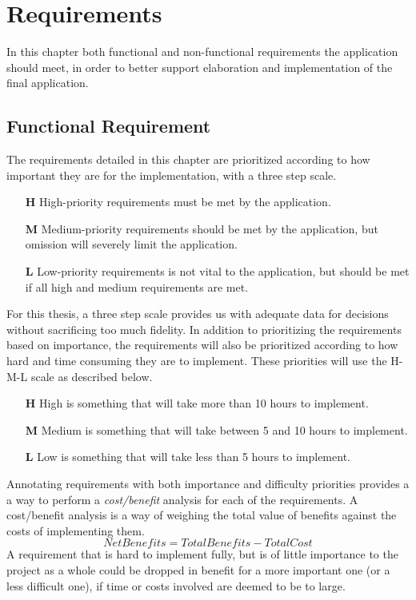\chapter{Requirements}
\label{chap:requirements}
In this chapter both functional and non-functional requirements the application should meet, in order to better support elaboration and implementation of the final application. 
\section{Functional Requirement}
\label{cha:funcreq}
The requirements detailed in this chapter are prioritized according to how important they are for the implementation, with a three step scale. 

\vspace{0.5cm}
\begin{itemize}
    \item[\textbf{H}]{High-priority requirements must be met by the application.} 
    \item[\textbf{M}]{Medium-priority requirements should be met by the application, but omission will severely limit the application.}
    \item[\textbf{L}]{Low-priority requirements is not vital to the application, but should be met if all high and medium requirements are met.}
\end{itemize}
\vspace{0.5cm}

For this thesis, a three step scale provides us with adequate data for decisions without sacrificing too much fidelity.
In addition to prioritizing the requirements based on importance, the requirements will also be prioritized according to how hard and time consuming they are to implement. These priorities will use the H-M-L scale as described below. 

\vspace{0.5cm}
\begin{itemize}
    \item[\textbf{H}]{High is something that will take more than 10 hours to implement.}
    \item[\textbf{M}]{Medium is something that will take between 5 and 10 hours to implement.}
    \item[\textbf{L}]{Low is something that will take less than 5 hours to implement.}
\end{itemize}
\vspace{0.5cm}
Annotating requirements with both importance and difficulty priorities provides a a way to perform a \emph{cost/benefit} analysis for each of the requirements. A cost/benefit analysis is a way of weighing the total value of benefits against the costs of implementing them\citep{cellini2010cost}.
\begin{equation}
Net Benefits = Total Benefits - Total Cost
\end{equation}
A requirement that is hard to implement fully, but is of little importance to the project as a whole could be dropped in benefit for a more important one (or a less difficult one), if time or costs involved are deemed to be to large.

